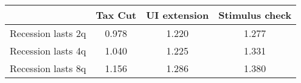 \begin{tabular}{@{}lccc@{}}
\toprule
& Tax Cut    & UI extension    & Stimulus check    \\  \midrule
Recession lasts 2q &0.978  & 1.220  & 1.277     \\
Recession lasts 4q &1.040  & 1.225  & 1.331     \\
Recession lasts 8q &1.156  & 1.286  & 1.380     \\
\end{tabular}
